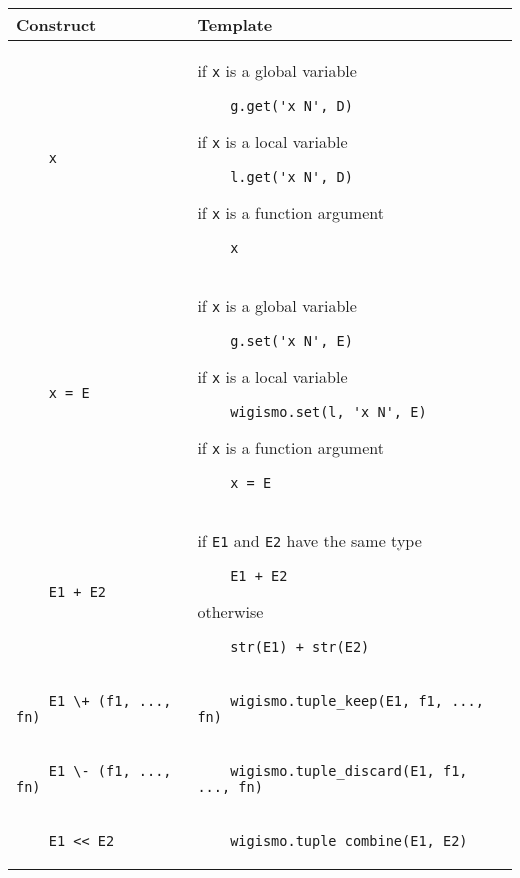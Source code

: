 \documentclass{WigReport}
\begin{document}
\noindent
\begin{tabular}{| p{20em} | p{30em} |}
    \hline
    Construct & Template \\ \hline
    \begin{verbatim}
    x
    \end{verbatim}
    &
    if {\tt x} is a global variable
    \begin{verbatim}
    g.get('x_N', D)
    \end{verbatim}
    if {\tt x} is a local variable 
    \begin{verbatim}
    l.get('x_N', D)
    \end{verbatim}
    if {\tt x} is a function argument
    \begin{verbatim}
    x 
    \end{verbatim}
    \\ \hline
    \begin{verbatim}
    x = E
    \end{verbatim}
    & 
    if {\tt x} is a global variable 
    \begin{verbatim}
    g.set('x_N', E)
    \end{verbatim}
    if {\tt x} is a local variable
    \begin{verbatim}
    wigismo.set(l, 'x_N', E)
    \end{verbatim}
    if {\tt x} is a function argument  
    \begin{verbatim}
    x = E
    \end{verbatim}
    \\ \hline
    \begin{verbatim}
    E1 + E2
    \end{verbatim}
    &
    if {\tt E1} and {\tt E2} have the same type
    \begin{verbatim}
    E1 + E2
    \end{verbatim}
    otherwise
    \begin{verbatim}
    str(E1) + str(E2)
    \end{verbatim}
    \\ \hline
    \begin{verbatim}
    E1 \+ (f1, ..., fn) 
    \end{verbatim}
    &
    \begin{verbatim}
    wigismo.tuple_keep(E1, f1, ..., fn)
    \end{verbatim}
    \\ \hline
    \begin{verbatim}
    E1 \- (f1, ..., fn) 
    \end{verbatim}
    &
    \begin{verbatim}
    wigismo.tuple_discard(E1, f1, ..., fn)
    \end{verbatim}
    \\ \hline
    \begin{verbatim}
    E1 << E2
    \end{verbatim}
    &
    \begin{verbatim}
    wigismo.tuple_combine(E1, E2)
    \end{verbatim}
    \\ \hline
\end{tabular}
\end{document}
